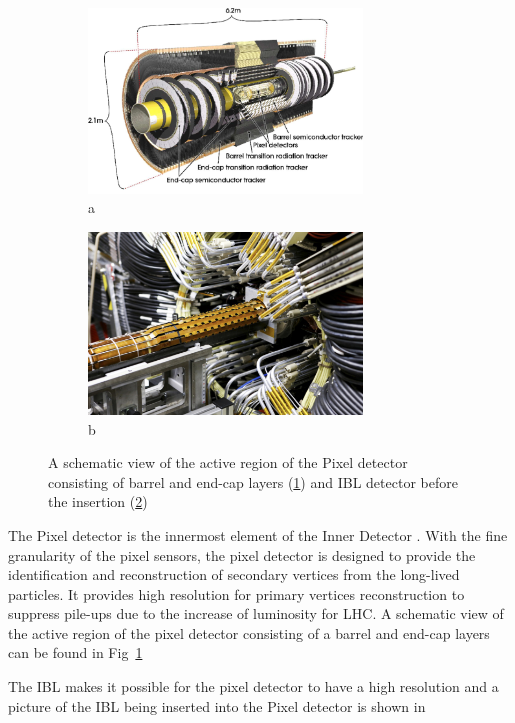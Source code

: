 \begin{figure}[htbp!]
\begin{subfigure}{.5\textwidth}
 \centering
 \includegraphics[width=0.8\textwidth]{chapters/c4/figures/pixel}

 \caption{a}
 \label{fig:pixel1}
\end{subfigure}%
\begin{subfigure}{.5\textwidth}
 \centering
 \includegraphics[width=0.8\textwidth]{chapters/c4/figures/IBL}
 \caption{b}
 \label{fig:pixel2}
\end{subfigure}
 \caption{A schematic view of the active region of the Pixel detector consisting of barrel and end-cap layers (\ref{fig:pixel1}) and IBL detector before the insertion (\ref{fig:pixel2})}
\label{fig:pixel}
\end{figure}
\par The Pixel detector is the innermost element of the Inner Detector \cite{Hirono:2641635}. With the fine granularity of the pixel sensors, 
the pixel detector is designed to provide the identification and reconstruction of secondary vertices from the long-lived particles. It provides high resolution for primary vertices reconstruction to suppress pile-ups due to the increase of luminosity for LHC. A schematic view of the active region of the pixel detector consisting of a barrel and end-cap layers can be found in Fig~\ref{fig:pixel1}
\par The IBL makes it possible for the pixel detector to have a high resolution and a picture of the IBL being inserted into the Pixel detector is shown in 


